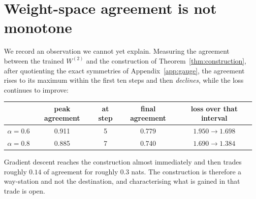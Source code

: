\section{Weight-space agreement is not monotone}
\label{app:peak}

We record an observation we cannot yet explain. Measuring the agreement between the trained
$W^{(2)}$ and the construction of Theorem~\ref{thm:construction}, after quotienting the exact
symmetries of Appendix~\ref{app:gauge}, the agreement rises to its maximum within the first ten
steps and then \emph{declines}, while the loss continues to improve:

\begin{center}
\begin{tabular}{lcccc}
\toprule
& peak agreement & at step & final agreement & loss over that interval \\
\midrule
$\alpha=0.6$ & 0.911 & 5 & 0.779 & $1.950\to1.698$ \\
$\alpha=0.8$ & 0.885 & 7 & 0.740 & $1.690\to1.384$ \\
\bottomrule
\end{tabular}
\end{center}

Gradient descent reaches the construction almost immediately and then trades roughly $0.14$ of
agreement for roughly $0.3$ nats. The construction is therefore a way-station and not the
destination, and characterising what is gained in that trade is open.
